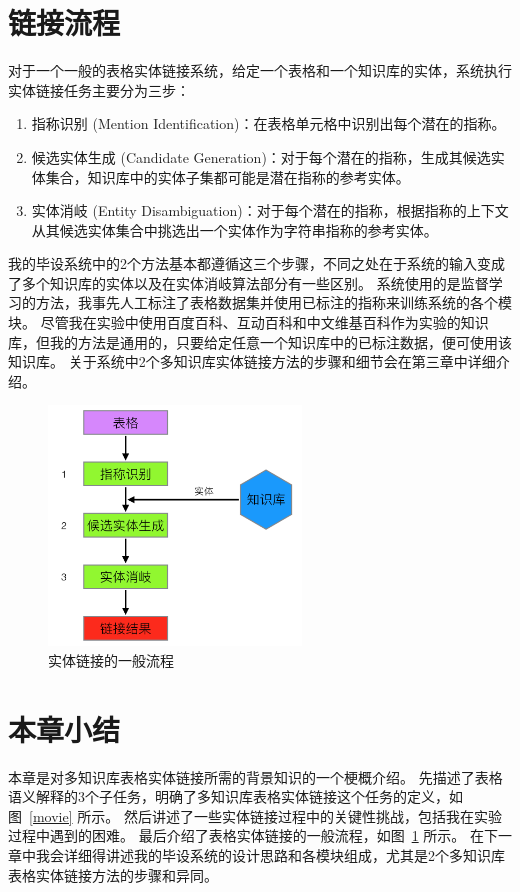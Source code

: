 \section{链接流程}

对于一个一般的表格实体链接系统，给定一个表格和一个知识库的实体，系统执行实体链接任务主要分为三步：

\begin{enumerate}[1.]
\item 指称识别 (Mention Identification)：在表格单元格中识别出每个潜在的指称。
\item 候选实体生成 (Candidate Generation)：对于每个潜在的指称，生成其候选实体集合，知识库中的实体子集都可能是潜在指称的参考实体。
\item 实体消岐 (Entity Disambiguation)：对于每个潜在的指称，根据指称的上下文从其候选实体集合中挑选出一个实体作为字符串指称的参考实体。
\end{enumerate}

我的毕设系统中的2个方法基本都遵循这三个步骤，不同之处在于系统的输入变成了多个知识库的实体以及在实体消岐算法部分有一些区别。
系统使用的是监督学习的方法，我事先人工标注了表格数据集并使用已标注的指称来训练系统的各个模块。
尽管我在实验中使用百度百科、互动百科和中文维基百科作为实验的知识库，但我的方法是通用的，只要给定任意一个知识库中的已标注数据，便可使用该知识库。
关于系统中2个多知识库实体链接方法的步骤和细节会在第三章中详细介绍。

\begin{figure}[htbp]
\centering
\includegraphics[width=0.6\textwidth]{img/flow}
\caption{实体链接的一般流程}
\label{flow}
\end{figure}


\section{本章小结}
本章是对多知识库表格实体链接所需的背景知识的一个梗概介绍。
先描述了表格语义解释的3个子任务，明确了多知识库表格实体链接这个任务的定义，如图~\ref{movie} 所示。
然后讲述了一些实体链接过程中的关键性挑战，包括我在实验过程中遇到的困难。
最后介绍了表格实体链接的一般流程，如图~\ref{flow} 所示。
在下一章中我会详细得讲述我的毕设系统的设计思路和各模块组成，尤其是2个多知识库表格实体链接方法的步骤和异同。





